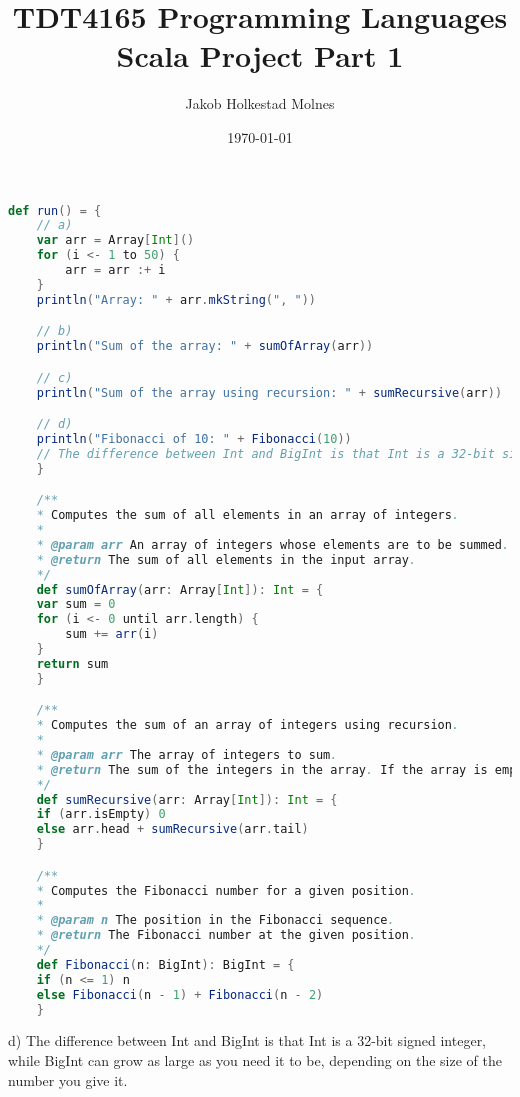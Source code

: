 \documentclass[11pt,a4paper]{report}
\title{TDT4165 Programming Languages Scala Project Part 1}
\author{Jakob Holkestad Molnes}
\date{\today}
\begin{document}
\maketitle


\section{}

\begin{lstlisting}[language=scala]
def run() = {
    // a)
    var arr = Array[Int]()
    for (i <- 1 to 50) {
        arr = arr :+ i
    }
    println("Array: " + arr.mkString(", "))

    // b)
    println("Sum of the array: " + sumOfArray(arr))

    // c)
    println("Sum of the array using recursion: " + sumRecursive(arr))

    // d)
    println("Fibonacci of 10: " + Fibonacci(10))
    // The difference between Int and BigInt is that Int is a 32-bit signed integer, while BigInt can grow as large as you need it to be, depending on the size of the number you give it.
    }

    /**
    * Computes the sum of all elements in an array of integers.
    *
    * @param arr An array of integers whose elements are to be summed.
    * @return The sum of all elements in the input array.
    */
    def sumOfArray(arr: Array[Int]): Int = {
    var sum = 0
    for (i <- 0 until arr.length) {
        sum += arr(i)
    }
    return sum
    }

    /**
    * Computes the sum of an array of integers using recursion.
    *
    * @param arr The array of integers to sum.
    * @return The sum of the integers in the array. If the array is empty, returns 0.
    */
    def sumRecursive(arr: Array[Int]): Int = {
    if (arr.isEmpty) 0
    else arr.head + sumRecursive(arr.tail)
    }

    /**
    * Computes the Fibonacci number for a given position.
    *
    * @param n The position in the Fibonacci sequence.
    * @return The Fibonacci number at the given position.
    */
    def Fibonacci(n: BigInt): BigInt = {
    if (n <= 1) n
    else Fibonacci(n - 1) + Fibonacci(n - 2)
    }
\end{lstlisting}
d)
The difference between Int and BigInt is that Int is a 32-bit signed integer, while BigInt can grow as large as you need it to be, depending on the size of the number you give it.
\end{document}
